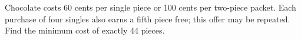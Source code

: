 Chocolate costs 60 cents per single piece or 100 cents per two-piece packet. Each purchase of four singles also earns a fifth piece free; this offer may be repeated. Find the minimum cost of exactly 44 pieces.
